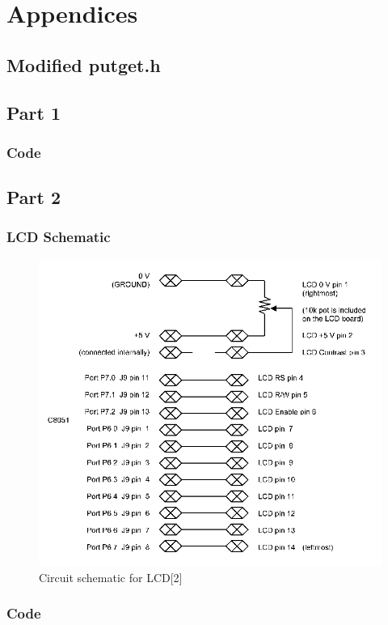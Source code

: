 \documentclass[12pt]{article}
\begin{document}
\section{Appendices}
\subsection{Modified putget.h}


\subsection{Part 1}
\subsubsection{Code}
	
\subsection{Part 2}
\subsubsection{LCD Schematic}
\begin{figure}[H]
	\centering
	\includegraphics[width=\textwidth]{lcd_schematic.png}
	\caption[]{Circuit schematic for LCD[2]}
	\label{LCD}
\end{figure}

\subsubsection{Code}
		
\end{document}
